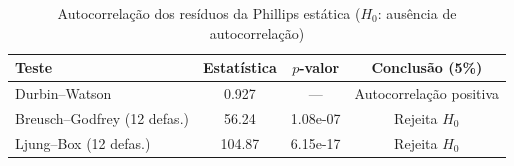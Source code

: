 \begin{table}[htbp]
\centering
\caption{Autocorrelação dos resíduos da Phillips estática ($H_0$: ausência de autocorrelação)}
\label{tab:autocorr}
\begin{tabular}{lccc}
\toprule
Teste & Estatística & $p$-valor & Conclusão (5\%) \\
\midrule
Durbin--Watson & 0.927 & --- & Autocorrelação positiva \\
Breusch--Godfrey (12 defas.) & 56.24 & 1.08e-07 & Rejeita $H_0$ \\
Ljung--Box (12 defas.) & 104.87 & 6.15e-17 & Rejeita $H_0$ \\
\bottomrule
\end{tabular}
\end{table}
